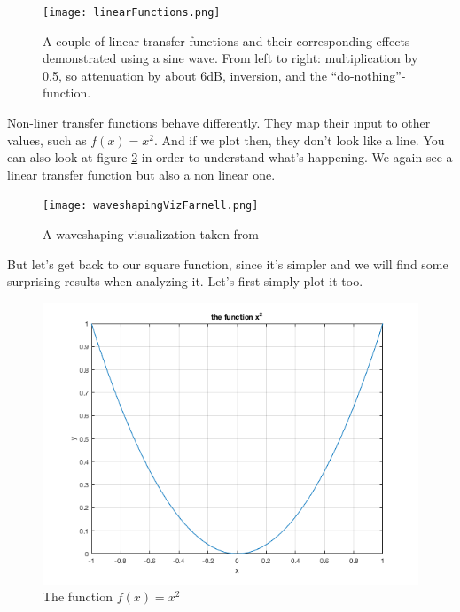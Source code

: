 \begin{figure}[h!]
	\centering
	\texttt{[image: linearFunctions.png]}
	\caption[shortCaption]
	{A couple of linear transfer functions and their corresponding effects demonstrated using a sine wave. From left to right: multiplication by 0.5, so attenuation by about 6dB, inversion, and the ``do-nothing''-function.}
	\label{fig:linears}
\end{figure}


Non-liner transfer functions behave differently. They map their input to other values, such as $f(x) = x^2$. And if we plot then, they don't look like a line.  You can also look at figure \ref{fig:farnellWaveShaping} in order to understand what's happening. We again see a linear transfer function but also a non linear one. 
\begin{figure}[H]
	\centering
	\texttt{[image: waveshapingVizFarnell.png]}
	\caption[farnell wave shaping visualization]
	{A waveshaping visualization taken from \cite{farnell_designing_2010}}
	\label{fig:farnellWaveShaping}
\end{figure}

But let's get back to our square function, since it's simpler and we will find some surprising results when analyzing it. Let's first simply plot it too. 


\begin{figure}[H]
	\begin{center}
		\includegraphics[width = 14cm]{img/squareFunction.png}
		\caption{The function $f(x)=x^2$}
		\label{fig:square}
	\end{center}
\end{figure}

